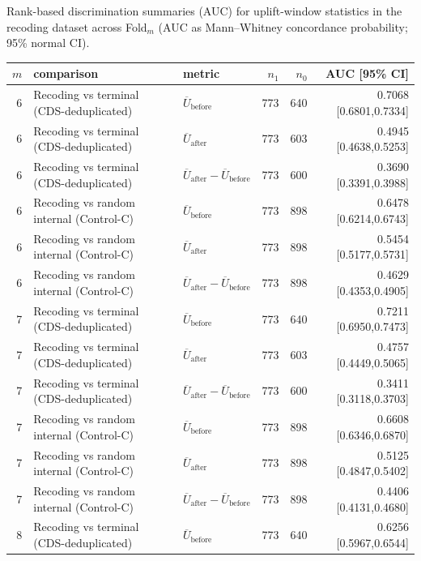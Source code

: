 Rank-based discrimination summaries (AUC) for uplift-window statistics in the recoding dataset across Fold$_m$ (AUC as Mann--Whitney concordance probability; 95\% normal CI).

\begingroup
{}
\small
\setlength{\tabcolsep}{4pt}
\renewcommand{\arraystretch}{1.15}
\setlength{\LTleft}{0pt}
\setlength{\LTright}{0pt}
\begin{longtable}{r l l r r r}
\toprule
$m$ & comparison & metric & $n_1$ & $n_0$ & AUC [95\% CI] \\
\midrule
6 & Recoding vs terminal (CDS-deduplicated) & $\overline{U}_{\mathrm{before}}$ & 773 & 640 & 0.7068 [0.6801,0.7334] \\
6 & Recoding vs terminal (CDS-deduplicated) & $\overline{U}_{\mathrm{after}}$ & 773 & 603 & 0.4945 [0.4638,0.5253] \\
6 & Recoding vs terminal (CDS-deduplicated) & $\overline{U}_{\mathrm{after}}-\overline{U}_{\mathrm{before}}$ & 773 & 600 & 0.3690 [0.3391,0.3988] \\
6 & Recoding vs random internal (Control-C) & $\overline{U}_{\mathrm{before}}$ & 773 & 898 & 0.6478 [0.6214,0.6743] \\
6 & Recoding vs random internal (Control-C) & $\overline{U}_{\mathrm{after}}$ & 773 & 898 & 0.5454 [0.5177,0.5731] \\
6 & Recoding vs random internal (Control-C) & $\overline{U}_{\mathrm{after}}-\overline{U}_{\mathrm{before}}$ & 773 & 898 & 0.4629 [0.4353,0.4905] \\
7 & Recoding vs terminal (CDS-deduplicated) & $\overline{U}_{\mathrm{before}}$ & 773 & 640 & 0.7211 [0.6950,0.7473] \\
7 & Recoding vs terminal (CDS-deduplicated) & $\overline{U}_{\mathrm{after}}$ & 773 & 603 & 0.4757 [0.4449,0.5065] \\
7 & Recoding vs terminal (CDS-deduplicated) & $\overline{U}_{\mathrm{after}}-\overline{U}_{\mathrm{before}}$ & 773 & 600 & 0.3411 [0.3118,0.3703] \\
7 & Recoding vs random internal (Control-C) & $\overline{U}_{\mathrm{before}}$ & 773 & 898 & 0.6608 [0.6346,0.6870] \\
7 & Recoding vs random internal (Control-C) & $\overline{U}_{\mathrm{after}}$ & 773 & 898 & 0.5125 [0.4847,0.5402] \\
7 & Recoding vs random internal (Control-C) & $\overline{U}_{\mathrm{after}}-\overline{U}_{\mathrm{before}}$ & 773 & 898 & 0.4406 [0.4131,0.4680] \\
8 & Recoding vs terminal (CDS-deduplicated) & $\overline{U}_{\mathrm{before}}$ & 773 & 640 & 0.6256 [0.5967,0.6544] \\

\end{longtable}
